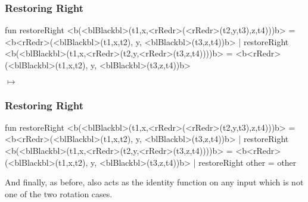 \documentclass[aspectratio=169, handout]{beamer}
\begin{document}
\begin{frame}[fragile]
  \frametitle{Restoring Right}

  \begin{codeblock}
    fun restoreRight <b(<blBlackbl>(t1,x,<rRedr>(<rRedr>(t2,y,t3),z,t4)))b> =
          <b<rRedr>(<blBlackbl>(t1,x,t2), y, <blBlackbl>(t3,z,t4))b>
      | restoreRight <b(<blBlackbl>(t1,x,<rRedr>(t2,y,<rRedr>(t3,z,t4))))b> =
          <b<rRedr>(<blBlackbl>(t1,x,t2), y, <blBlackbl>(t3,z,t4))b>
  \end{codeblock}

  \pause
  \begin{center}
    \begin{minipage}{0.35\textwidth}
      \centering
    \end{minipage}
    \pause
    \begin{minipage}{0.1\textwidth}
      \centering
      \large$\longmapsto$
    \end{minipage}
    \begin{minipage}{0.35\textwidth}
      \centering
    \end{minipage}
  \end{center}
\end{frame}

\begin{frame}[fragile]
  \frametitle{Restoring Right}

  \begin{codeblock}
    fun restoreRight <b(<blBlackbl>(t1,x,<rRedr>(<rRedr>(t2,y,t3),z,t4)))b> =
          <b<rRedr>(<blBlackbl>(t1,x,t2), y, <blBlackbl>(t3,z,t4))b>
      | restoreRight <b(<blBlackbl>(t1,x,<rRedr>(t2,y,<rRedr>(t3,z,t4))))b> =
          <b<rRedr>(<blBlackbl>(t1,x,t2), y, <blBlackbl>(t3,z,t4))b>
      | restoreRight other = other
  \end{codeblock}

  \pause
  \vspace{\fill}

  And finally, as before,  also acts as the identity function
  on any input which is not one of the two rotation cases.
\end{frame}
\end{document}
